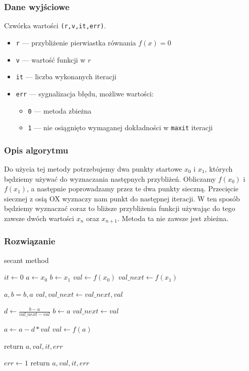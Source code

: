 \documentclass{article}
\begin{document}
\subsubsection*{Dane wyjściowe}
	Czwórka wartości \texttt{(r,v,it,err)}.
	\begin{itemize}
	    \item \texttt{r} — przybliżenie pierwiastka równania $f(x) = 0$
	    \item \texttt{v} — wartość funkcji w $r$
	    \item \texttt{it} — liczba wykonanych iteracji
	    \item \texttt{err} — sygnalizacja błędu, możliwe wartości:
	    \begin{itemize}
	        \item \texttt{0} — metoda zbieżna
	        \item \texttt{1} — nie osiągnięto wymaganej dokładności w \texttt{maxit} iteracji
	    \end{itemize}
	\end{itemize}
\subsubsection*{Opis algorytmu}
	Do użycia tej metody potrzebujemy dwa punkty startowe $x_0$ i $x_1$, których będziemy używać do wyznaczania następnych przybliżeń. Obliczamy $f(x_0)$ i $f(x_1)$, a następnie poprowadzamy przez te dwa punkty sieczną. Przecięcie siecznej z osią OX wyznaczy nam punkt do następnej iteracji. W ten sposób będziemy wyznaczać coraz to bliższe przybliżenia funkcji używając do tego zawsze dwóch wartości $x_n$ oraz $x_{n+1}$.
	Metoda ta nie zawsze jest zbieżna.
\subsubsection*{Rozwiązanie}
	\begin{algorithm}[H]
	\caption{secant method}
	\begin{algorithmic}
		\State $it \gets 0$
		\State $a \gets x_0$
		\State $b \gets x_1$
		\State $val \gets f(x_0)$
		\State $val\_next \gets f(x_1)$

				\State $a, b = b, a$
				\State $val, val\_next \gets val\_next, val$
			\EndIf

			\State $d \gets \frac{b - a}{val\_next - val}$
			\State $b \gets a$
			\State $val\_next \gets val$

			\State $a \gets a - d * val$
			\State $val \gets f(a)$

				\State return $a, val, it ,err$
			\EndIf
		\EndFor

		\State $err \gets 1$
		\State return $a, val, it, err$
    \end{algorithmic}
    \end{algorithm}
\clearpage
\end{document}
